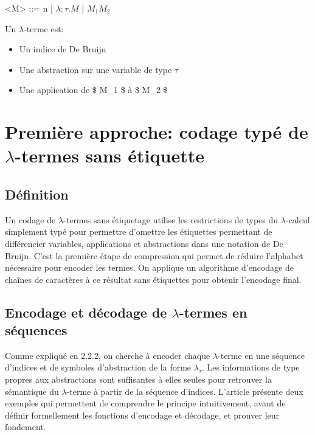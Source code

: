 \documentclass[titlepage]{article}
\providecommand{\tightlist}{%
  \setlength{\itemsep}{0pt}\setlength{\parskip}{0pt}}
\begin{document}
\begin{grammar}

\let\syntleft\relax
\let\syntright\relax

<M> ::= n
\alt    | $\lambda: \tau.M$
\alt    | $M_1 M_2$
\end{grammar}

Un \(\lambda\)-terme est:

\begin{itemize}
\tightlist
\item
  Un indice de De Bruijn
\item
  Une abstraction sur une variable de type \(\tau\)
\item
  Une application de \$ M\_1 \$ à \$ M\_2 \$
\end{itemize}

\section{Première approche: codage typé de $\lambda$-termes sans étiquette}\label{premiuxe8re-approche-codage-sans-uxe9tiquette-de-lambda-termes-basuxe9-sur-les-types}

\subsection{Définition}\label{duxe9finition}

Un codage de \(\lambda\)-termes sans étiquetage utilise les restrictions
de types du \(\lambda\)-calcul simplement typé pour permettre d'omettre
les étiquettes permettant de différencier variables, applications et
abstractions dans une notation de De Bruijn. C'est la première étape de
compression qui permet de réduire l'alphabet nécessaire pour encoder les
termes. On applique un algorithme d'encodage de chaînes de caractères à
ce résultat sans étiquettes pour obtenir l'encodage final.

\subsection{\texorpdfstring{Encodage et décodage de \(\lambda\)-termes
en
séquences}{Encodage et décodage de \(\lambda\)-termes en séquences}}\label{encodage-et-duxe9codage-de-lambda-termes-en-suxe9quences}

Comme expliqué en 2.2.2, on cherche à encoder chaque \(\lambda\)-terme
en une séquence d'indices et de symboles d'abstraction de la forme
\(\lambda_\tau\). Les informations de type propres aux abstractions sont
suffisantes à elles seules pour retrouver la sémantique du
\(\lambda\)-terme à partir de la séquence d'indices. L'article présente
deux exemples qui permettent de comprendre le principe intuitivement,
avant de définir formellement les fonctions d'encodage et décodage, et
prouver leur fondement.
\end{document}
